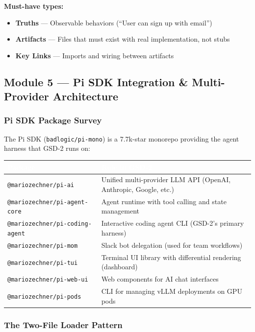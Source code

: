 \documentclass[11pt,letterpaper]{article}
\newcommand{\tableheader}[1]{\textbf{\sffamily\textcolor{white}{#1}}}
\begin{document}
\textbf{Must-have types:}
\begin{itemize}
  \item \textbf{Truths} --- Observable behaviors (``User can sign up with email'')
  \item \textbf{Artifacts} --- Files that must exist with real implementation, not stubs
  \item \textbf{Key Links} --- Imports and wiring between artifacts
\end{itemize}

\subsection{Module 5 --- Pi SDK Integration \& Multi-Provider Architecture}

\subsubsection{Pi SDK Package Survey}

The Pi SDK (\texttt{badlogic/pi-mono}) is a 7.7k-star monorepo providing the agent harness that GSD-2 runs on:

\begin{center}
\begin{tabularx}{\textwidth}{L{5cm}X}
\toprule
{}
\tableheader{Package} & \tableheader{Role in GSD-2} \\
\midrule
\texttt{@mariozechner/pi-ai} & Unified multi-provider LLM API (OpenAI, Anthropic, Google, etc.) \\
\texttt{@mariozechner/pi-agent-core} & Agent runtime with tool calling and state management \\
\texttt{@mariozechner/pi-coding-agent} & Interactive coding agent CLI (GSD-2's primary harness) \\
\texttt{@mariozechner/pi-mom} & Slack bot delegation (used for team workflows) \\
\texttt{@mariozechner/pi-tui} & Terminal UI library with differential rendering (dashboard) \\
\texttt{@mariozechner/pi-web-ui} & Web components for AI chat interfaces \\
\texttt{@mariozechner/pi-pods} & CLI for managing vLLM deployments on GPU pods \\
\bottomrule
\end{tabularx}
\end{center}

\subsubsection{The Two-File Loader Pattern}
\end{document}
